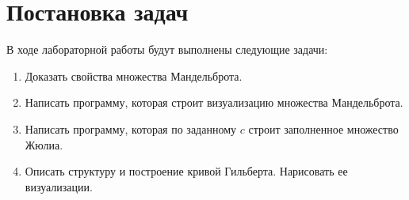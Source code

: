 \section{Постановка задач}

В ходе лабораторной работы будут выполнены следующие задачи:

\begin{enumerate}
  \item Доказать свойства множества Мандельброта.
  \item Написать программу, которая строит визуализацию множества Мандельброта. 
  \item Написать программу, которая по заданному $c$ строит заполненное множество Жюлиа.
  \item Описать структуру и построение кривой Гильберта. Нарисовать ее визуализации.
\end{enumerate}